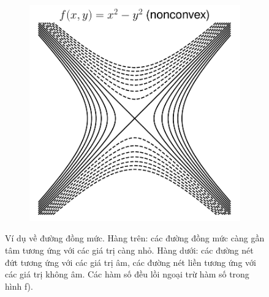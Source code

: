 \begin{figure}[t]
\begin{subfigure}{0.325\textwidth}
\caption{}
\label{fig:16_contourse}
\end{subfigure}
\begin{subfigure}{0.325\textwidth}
\includegraphics[height=1.02\linewidth]{ebookML_src/src/convexity/hyper_2d_2.pdf}
\caption{}
\label{fig:16_contoursf}
\end{subfigure}
\caption{Ví dụ về đường đồng mức. Hàng trên: các đường đồng mức càng gần tâm tương ứng với các giá trị càng nhỏ. Hàng dưới: các đường nét đứt tương ứng với các giá trị âm, các đường nét liền tương ứng với các giá trị không âm. Các hàm số đều lồi ngoại trừ hàm số trong hình f).}
\label{fig:16_contours}
\end{figure}

